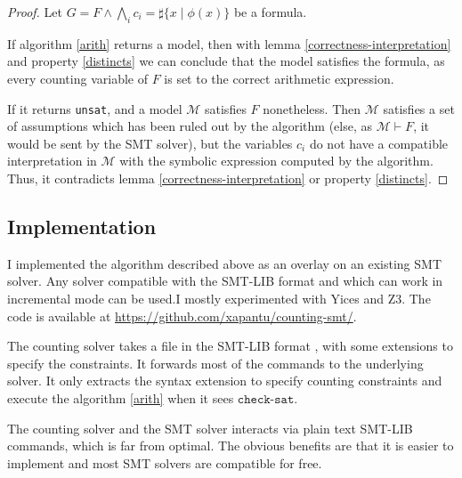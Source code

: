 \documentclass[]{article}
\begin{document}
\begin{proof}
Let $G = F \land \bigwedge\limits_{i} c_i = \sharp\{x\mid\phi(x)\}$ be a formula.

If algorithm \ref{arith} returns a model, then with lemma \ref{correctness-interpretation} and property
\ref{distincts} we can conclude that the model satisfies the formula, as every counting variable of
$F$ is set to the correct arithmetic expression.

If it returns \texttt{unsat}, and a model $\mathcal{M}$ satisfies $F$ nonetheless. Then $\mathcal{M}$
satisfies a set of assumptions which has been ruled out by the algorithm (else, as $\mathcal{M}
\vdash F$, it would be sent by the SMT solver), but the variables $c_i$ do not have a compatible
interpretation in $\mathcal{M}$ with the symbolic expression computed by the algorithm. Thus, it
contradicts lemma \ref{correctness-interpretation} or property \ref{distincts}.
\end{proof}

\subsection{Implementation}

I implemented the algorithm described above as an overlay on an existing SMT solver. Any solver
compatible with the SMT-LIB format \cite{barrett2010smt} and which can work in incremental mode can
be used.I mostly experimented with Yices and Z3. The code is available at
\url{https://github.com/xapantu/counting-smt/}.

The counting solver takes a file in the SMT-LIB format \cite{barrett2010smt}, with some extensions
to specify the constraints. It forwards most of the commands to the underlying solver. It only
extracts the syntax extension to specify counting constraints and execute the algorithm \ref{arith}
when it sees $\texttt{check-sat}$.

The counting solver and the SMT solver interacts via plain text SMT-LIB  commands, which is far from
optimal. The obvious benefits are that it is easier to implement and most SMT solvers are compatible
for free.
\end{document}
